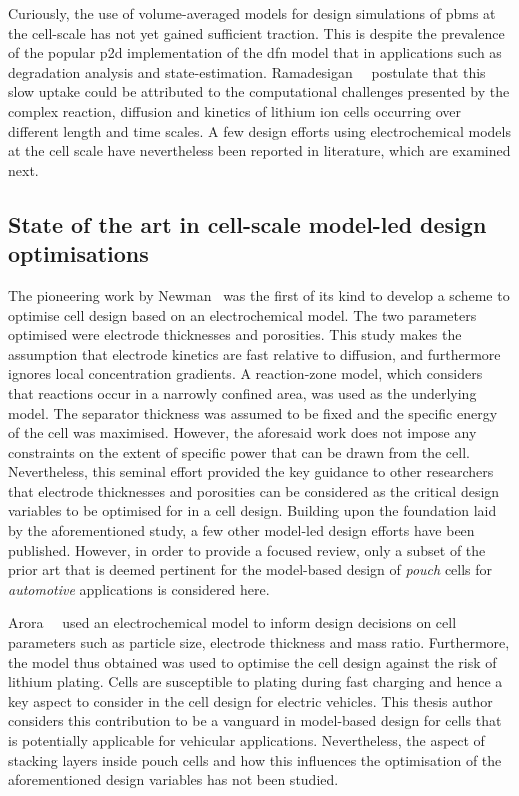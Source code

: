 Curiously,  the  use  of  volume-averaged   models  for  design  simulations  of
\glspl{pbm} at  the cell-scale has not  yet gained sufficient traction.  This is
despite the prevalence of the  popular \gls{p2d} implementation of the \gls{dfn}
model that  in applications such  as degradation analysis  and state-estimation.
Ramadesigan~\etal~\cite{Ramadesigan2012} postulate  that this slow  uptake could
be attributed to the computational challenges presented by the complex reaction,
diffusion and kinetics of lithium ion  cells occurring over different length and
time scales. A few design efforts using electrochemical models at the cell scale
have nevertheless been reported in literature, which are examined next.

\subsection{State of the art in cell-scale model-led design optimisations}

The pioneering  work by Newman~\cite{Newman1995}  was the  first of its  kind to
develop a scheme to optimise cell  design based on an electrochemical model. The
two parameters optimised  were electrode thicknesses and  porosities. This study
makes the assumption that electrode kinetics are fast relative to diffusion, and
furthermore ignores local concentration  gradients. A reaction-zone model, which
considers that  reactions occur  in a  narrowly confined area,  was used  as the
underlying  model. The  separator  thickness was  assumed to  be  fixed and  the
specific energy of the cell was  maximised. However, the aforesaid work does not
impose any constraints  on the extent of  specific power that can  be drawn from
the cell. Nevertheless,  this seminal effort provided the key  guidance to other
researchers that electrode  thicknesses and porosities can be  considered as the
critical design  variables to be optimised  for in a cell  design. Building upon
the foundation  laid by the aforementioned  study, a few other  model-led design
efforts have  been published. However,  in order  to provide a  focused review,
only a  subset of  the prior art  that is deemed  pertinent for  the model-based
design of  \emph{pouch} cells  for \emph{automotive} applications  is considered
here.

Arora~\etal~\cite{Arora1999}  used an  electrochemical  model  to inform  design
decisions on cell parameters such as particle size, electrode thickness and mass
ratio. Furthermore, the model thus obtained was used to optimise the cell design
against the  risk of lithium  plating. Cells  are susceptible to  plating during
fast charging and hence a key aspect to consider in the cell design for electric
vehicles. This  thesis author considers  this contribution  to be a  vanguard in
model-based  design  for cells  that  is  potentially applicable  for  vehicular
applications. Nevertheless, the aspect of stacking layers inside pouch cells and
how this influences the optimisation  of the aforementioned design variables has
not been studied.

